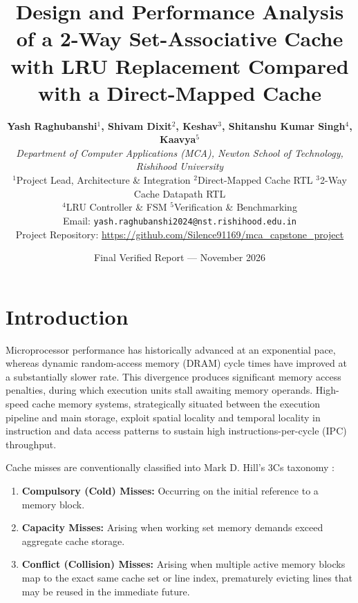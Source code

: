 \documentclass[10pt,twocolumn]{article}
\title{\textbf{\Large Design and Performance Analysis of a 2-Way Set-Associative Cache with LRU Replacement Compared with a Direct-Mapped Cache}}
\author{
\textbf{Yash Raghubanshi$^{1}$, Shivam Dixit$^{2}$, Keshav$^{3}$, Shitanshu Kumar Singh$^{4}$, Kaavya$^{5}$} \\
\textit{Department of Computer Applications (MCA), Newton School of Technology, Rishihood University} \\
$^{1}$Project Lead, Architecture \& Integration \quad
$^{2}$Direct-Mapped Cache RTL \quad
$^{3}$2-Way Cache Datapath RTL \\
$^{4}$LRU Controller \& FSM \quad
$^{5}$Verification \& Benchmarking \\
Email: \texttt{yash.raghubanshi2024@nst.rishihood.edu.in} \\
Project Repository: \url{https://github.com/Silence91169/mca_capstone_project}
}
\date{Final Verified Report --- November 2026}
\begin{document}

\section{Introduction}
Microprocessor performance has historically advanced at an exponential pace, whereas dynamic random-access memory (DRAM) cycle times have improved at a substantially slower rate. This divergence produces significant memory access penalties, during which execution units stall awaiting memory operands. High-speed cache memory systems, strategically situated between the execution pipeline and main storage, exploit spatial locality and temporal locality in instruction and data access patterns to sustain high instructions-per-cycle (IPC) throughput.

Cache misses are conventionally classified into Mark D. Hill's 3Cs taxonomy \cite{hill1987}:
\begin{enumerate}
    \item \textbf{Compulsory (Cold) Misses:} Occurring on the initial reference to a memory block.
    \item \textbf{Capacity Misses:} Arising when working set memory demands exceed aggregate cache storage.
    \item \textbf{Conflict (Collision) Misses:} Arising when multiple active memory blocks map to the exact same cache set or line index, prematurely evicting lines that may be reused in the immediate future.
\end{enumerate}
\end{document}
